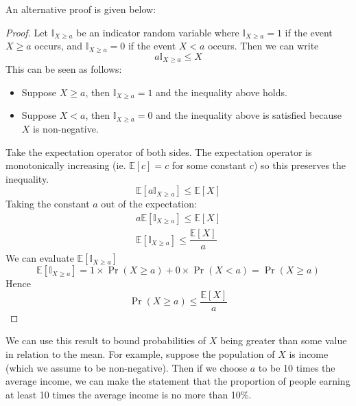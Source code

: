 \documentclass[11pt]{report} %
\begin{document}
An alternative proof is given below:
\begin{proof}
Let $\mathbb{I}_{X \geq a}$ be an indicator random variable where $\mathbb{I}_{X \geq a} = 1$ if the event $X \geq a$ occurs, and $\mathbb{I}_{X \geq a} = 0$ if the event $X < a$ occurs. Then we can write
\begin{equation}
a\mathbb{I}_{X \geq a} \leq X
\end{equation}
This can be seen as follows:
\begin{itemize}
\item Suppose $X \geq a$, then $\mathbb{I}_{X \geq a} = 1$ and the inequality above holds.
\item Suppose $X < a$, then $\mathbb{I}_{X \geq a} = 0$ and the inequality above is satisfied because $X$ is non-negative.
\end{itemize}
Take the expectation operator of both sides. The expectation operator is monotonically increasing (ie. $\mathbb{E}\left[c\right] = c$ for some constant $c$) so this preserves the inequality.
\begin{equation}
\mathbb{E}\left[a\mathbb{I}_{X \geq a}\right] \leq \mathbb{E}\left[X\right]
\end{equation}
Taking the constant $a$ out of the expectation:
\begin{gather}
a\mathbb{E}\left[\mathbb{I}_{X \geq a}\right] \leq \mathbb{E}\left[X\right] \\
\mathbb{E}\left[\mathbb{I}_{X \geq a}\right] \leq \dfrac{\mathbb{E}\left[X\right]}{a}
\end{gather}
We can evaluate $\mathbb{E}\left[\mathbb{I}_{X \geq a}\right]$
\begin{equation}
\mathbb{E}\left[\mathbb{I}_{X \geq a}\right] = 1\times\operatorname{Pr}\left(X\geq a\right) + 0\times\operatorname{Pr}\left(X < a\right) = \operatorname{Pr}\left(X\geq a\right)
\end{equation}
Hence
\begin{equation}
\operatorname{Pr}\left(X\geq a\right) \leq \dfrac{\mathbb{E}\left[X\right]}{a}
\end{equation}
\end{proof}

We can use this result to bound probabilities of $X$ being greater than some value in relation to the mean. For example, suppose the population of $X$ is income (which we assume to be non-negative). Then if we choose $a$ to be 10 times the average income, we can make the statement that the proportion of people earning at least 10 times the average income is no more than 10\%.
\end{document}
